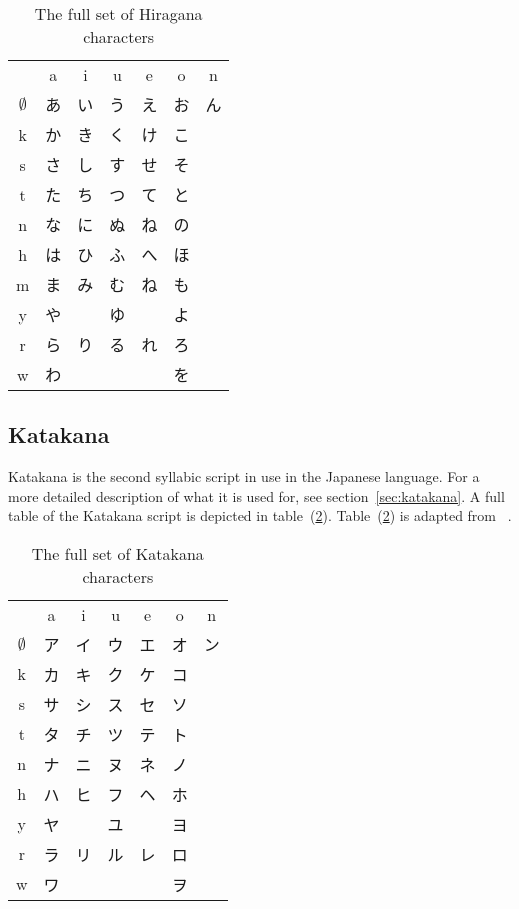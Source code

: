 \begin{table}[htbp]
\begin{CJK}
  \begin{tabular}{c c c c c c c}
 &a&i&u&e&o&n\\
$\emptyset$&あ&い&う&え&お&ん\\
k&か&き&く&け&こ&\\
s&さ&し&す&せ&そ&\\
t&た&ち&つ&て&と&\\
n&な&に&ぬ&ね&の&\\
h&は&ひ&ふ&へ&ほ&\\
m&ま&み&む&ね&も&\\
y&や& &ゆ& &よ&\\
r&ら&り&る&れ&ろ&\\
w&わ& & & &を&\\
  \end{tabular}
\end{CJK}
\caption{The full set of Hiragana characters}
\label{table:fullhiragana}
\end{table}

\subsection{Katakana }
\label{sec:app:katakana}

Katakana is the second syllabic script in use in the Japanese language. 
For a more detailed description of what it is used for, see 
section~\ref{sec:katakana}.
A full table of the Katakana script is depicted in 
table~(\ref{table:fullkatakana}).
Table~(\ref{table:fullkatakana}) is adapted from ~\citeyear{Hadamitzky1995}.

\begin{table}[htbp]
\begin{CJK}
  \begin{tabular}{c c c c c c c}
 &a&i&u&e&o&n\\
$\emptyset$&ア&イ&ウ&エ&オ&ン\\
k&カ&キ&ク&ケ&コ&\\
s&サ&シ&ス&セ&ソ&\\
t&タ&チ&ツ&テ&ト&\\
n&ナ&ニ&ヌ&ネ&ノ&\\
h&ハ&ヒ&フ&ヘ&ホ&\\
y&ヤ&　&ユ&　&ヨ&\\
r&ラ&リ&ル&レ&ロ&\\
w&ワ&　&　&　&ヲ&\\
  \end{tabular}
\end{CJK}
\caption{The full set of Katakana characters}
\label{table:fullkatakana}
\end{table}



